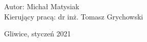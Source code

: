 \begin{onehalfspacing}
\begin{center}
\large
\begin{flushleft}
Autor: Michał Matysiak  \\
Kierujący pracą:  dr inż. Tomasz Grychowski \\
\end{flushleft}

\vspace{3cm}
Gliwice, styczeń 2021
\end{center}
\end{onehalfspacing}

\singlespacing
\newpage
\thispagestyle{empty}
\mbox{}




\doublespacing
\newpage
\thispagestyle{empty}
\mbox{}

\setcounter{page}{0} \pagestyle{plain}


\tableofcontents

\listoffigures
\listoftables



\pagestyle{fancy}